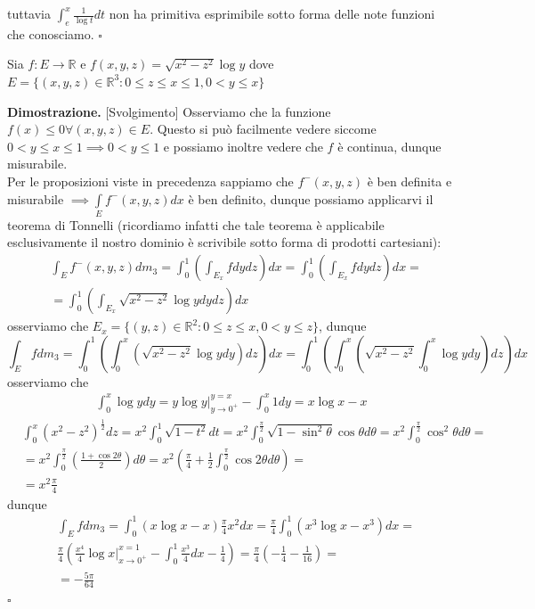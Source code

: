 	tuttavia $\int_e^x \frac{1}{\log{t}}dt$ non ha primitiva esprimibile sotto forma delle note funzioni che conosciamo. 
\hfill $\square$
%
\vspace{0.5cm}
\begin{exercise}
	Sia $f: E \to \mathbb{R}$ e $f(x, y, z) = \sqrt{x^2 - z^2}\log{y}$ dove $E = \{(x, y, z) \in \mathbb{R}^3 : 0 \leq z \leq x \leq 1, 0 < y \leq x \}$
\end{exercise}
%
\noindent \textbf{Dimostrazione. }[Svolgimento]
	Osserviamo che la funzione $f(x) \leq 0 \forall (x, y, z) \in E$. Questo si può facilmente vedere siccome $0 < y \leq x \leq 1 \implies 0 < y \leq 1$ e possiamo inoltre vedere che $f$ è continua, dunque misurabile. \\
	Per le proposizioni viste in precedenza sappiamo che $f^{-}(x, y, z)$ è ben definita e misurabile $\implies \int\limits_E f^{-}(x, y, z)dx$ è ben definito, dunque possiamo applicarvi il teorema di Tonnelli (ricordiamo infatti che tale teorema è applicabile esclusivamente il nostro dominio è
	scrivibile sotto forma di prodotti cartesiani):
	\[\begin{aligned}
	&\int_E f^{-}(x, y, z)dm_3 = \int_0^1 \left( \int_{E_x} f dydz \right) dx = \int_0^1 \left( \int_{E_x} fdydz \right)dx = \\
	&=\int_0^1 \left( \int_{E_x} \sqrt{x^2 - z^2}\log{y}dydz \right)dx
	\end{aligned}\]
	osserviamo che $E_x = \{(y, z) \in \mathbb{R}^2 : 0 \leq z \leq x, 0 < y \leq z \}$, dunque
	$$
	\int_E fdm_3 = \int_0^1 \left( \int_0^x \left( \sqrt{x^2 - z^2} \log{y} dy \right)dz \right)dx = \int_0^1 \left(\int_0^x \left( \sqrt{x^2 - z^2} \int_0^x \log{y} dy \right)dz \right) dx 
	$$
	osserviamo che
	\[\begin{aligned}
	\int_0^x \log{y}dy = y\log{y}\Bigg|_{y \to 0^+}^{y=x} - \int_0^x 1dy = x\log{x} - x
	\end{aligned}\]
	\[\begin{aligned}
		&\int_0^x (x^2 - z^2)^{\frac{1}{2}}dz = x^2 \int_0^1 \sqrt{1-t^2}dt = x^2 \int_0^{\frac{\pi}{2}} \sqrt{1-\sin^2{\theta}}\cos{\theta}d\theta = x^2 \int_0^\frac{\pi}{2} \cos^2{\theta}d\theta = \\
		&=x^2 \int_0^\frac{\pi}{2} \left(\frac{1+\cos{2\theta}}{2} \right)d\theta = x^2 \left( \frac{\pi}{4} + \frac{1}{2}\int_0^{\frac{\pi}{2}} \cos{2 \theta}d\theta \right) = \\
		&=x^2 \frac{\pi}{4}
	\end{aligned}\]
	dunque
	\[\begin{aligned}
	&\int_E fdm_3 = \int_0^1 (x \log{x} - x) \frac{\pi}{4}x^2 dx = \frac{\pi}{4} \int_0^1 \left( x^3 \log{x} - x^3 \right) dx = \\
	&\frac{\pi}{4} \left( \frac{x^4}{4} \log{x}\Bigg|_{x \to 0^+}^{x=1} - \int_0^1 \frac{x^3}{4}dx - \frac{1}{4} \right) = \frac{\pi}{4} \left(-\frac{1}{4} - \frac{1}{16} \right) = \\
	&= -\frac{5\pi}{64}
	\end{aligned}\]
\hfill $\square$
%

